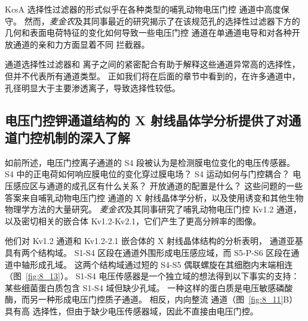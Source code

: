 KcsA 选择性过滤器的形式似乎在各种类型的哺乳动物电压门控  通道中高度保守。
然而，\textit{麦金农}及其同事最近的研究揭示了在该规范孔的选择性过滤器下方的几何和表面电荷特征的变化如何导致一些电压门控  通道在单通道电导和对各种开放通道的亲和力方面显着不同 拦截器。


 通道选择性过滤器和  离子之间的紧密配合有助于解释这些通道异常高的选择性，但并不代表所有通道类型。
正如我们将在后面的章节中看到的，在许多通道中，孔径明显大于主要渗透离子，导致选择性较低。



\subsection{电压门控钾通道结构的 X 射线晶体学分析提供了对通道门控机制的深入了解}

如前所述，电压门控离子通道的 S4 段被认为是检测膜电位变化的电压传感器。
S4 中的正电荷如何响应膜电位的变化穿过膜电场？
S4 运动如何与门控耦合？
电压感应区与通道的成孔区有什么关系？
开放通道的配置是什么？
这些问题的一些答案来自哺乳动物电压门控  通道的 X 射线晶体学分析，以及使用诱变和其他生物物理学方法的大量研究。
\textit{麦金农}及其同事研究了哺乳动物电压门控 Kv1.2  通道，以及密切相关的嵌合体 Kv1.2-Kv2.1，它们产生了更高分辨率的图像。


他们对 Kv1.2 通道和 Kv1.2-2.1 嵌合体的 X 射线晶体结构的分析表明， 通道亚基具有两个结构域。
S1-S4 区段在通道外围形成电压感应域，而 S5-P-S6 区段在通道中轴形成孔域。
这两个结构域通过短的 S4-S5 偶联螺旋在其细胞内末端相连（图~\ref{fig:8_13}）。
S1-S4 电压传感器是一个独立域的想法得到以下事实的支持：某些细菌蛋白质包含 S1-S4 域但缺少孔域。
一种这样的蛋白质是电压敏感磷酸酶，而另一种形成电压门控质子通道。
相反，内向整流  通道（图~\ref{fig:8_11}B）具有高  选择性，但由于缺少电压传感器域，因此不直接由电压门控。


